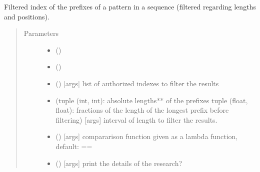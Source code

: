 \documentclass[letterpaper,10pt,english]{sphinxmanual}
\begin{document}
\begin{fulllineitems}
\label{\detokenize{index:PrefixIndexing.filtered_prefix_indexing}}
Filtered index of the prefixes of a pattern in a sequence (filtered regarding lengths and positions).
\begin{quote}\begin{description}
\item[{Parameters}] \leavevmode\begin{itemize}
\item {} 
 () \textendash{} 

\item {} 
 () \textendash{} 

\item {} 
 (\sphinxstyleliteralemphasis{ (}\sphinxstyleliteralemphasis{)}) \textendash{} {[}args{]} list of authorized indexes to filter the results

\item {} 
 (tuple (int, int): absolute lengths** of the prefixes  tuple (float, float): fractions of the length of the longest prefix before filtering) \textendash{} {[}args{]} interval of length to filter the results.

\item {} 
 () \textendash{} {[}args{]} compararison function given as a lambda function, default: ==

\item {} 
 () \textendash{} {[}args{]} print the details of the research?

\end{itemize}


\end{description}
\end{quote}
\end{fulllineitems}
\end{document}
